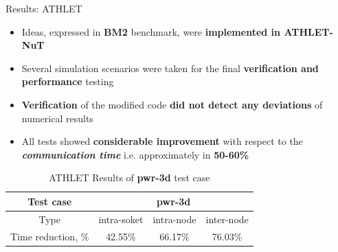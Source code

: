 \begin{frame}[t]{Results: ATHLET}
    \small
    \justifying
    
    \begin{itemize}
        \item Ideas, expressed in \textbf{BM2} benchmark,  were \textbf{implemented in ATHLET-NuT}
        
        \item Several simulation scenarios were taken for the final \textbf{verification and performance} testing
        
        \item \textbf{Verification} of the modified code \textbf{did not detect any deviations} of numerical results
        
        \item All tests showed  \textbf{considerable improvement} with respect to the \textit{\textbf{communication time}} i.e. approximately in \textbf{50-60\%}
    \end{itemize}

    \begin{table}[ht]
        \centering
        \begin{tabular}{|c|c|c|c|}
        \hline
Test case                                                    & \multicolumn{3}{c|}{pwr-3d}           \\ \hline
Type & intra-soket & intra-node & inter-node \\ \hline
Time reduction, \%                                           & 42.55\%     & 66.17\%    & 76.03\%    \\ \hline
        \end{tabular}
        \caption{ATHLET Results of \textbf{pwr-3d} test case}
    \end{table}

\end{frame}


